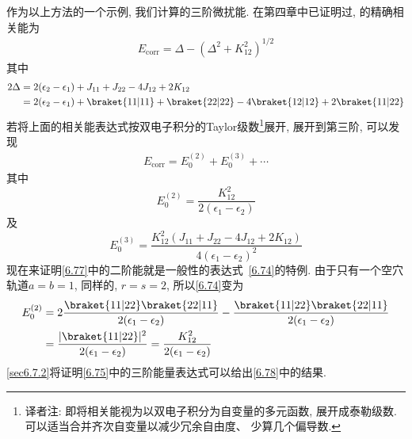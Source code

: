 作为以上方法的一个示例, 
我们计算的三阶微扰能. 
在第四章中已证明过, 
的精确相关能为
\begin{align}
E_\mathrm{corr} = \Delta - (\Delta^2 + K_{12}^2)^{1/2}
\label{6.76}
\end{align}
其中
\begin{align*}
2\Delta & = 2(\epsilon_2-\epsilon_1) + J_{11} + J_{22} - 4J_{12} + 2K_{12}\\
        & = 2(\epsilon_2-\epsilon_1) + \braket{11|11} + \braket{22|22} - 4\braket{12|12} + 2\braket{11|22}
\end{align*}
若将上面的相关能表达式按双电子积分的Taylor级数\footnote{
译者注: 即将相关能视为以双电子积分为自变量的多元函数,
展开成泰勒级数. 可以适当合并齐次自变量以减少冗余自由度、
少算几个偏导数.
}展开, 
展开到第三阶, 
可以发现
\begin{align*}
E_\mathrm{corr}  = E_0^{(2)} + E_0^{(3)} + \cdots
\end{align*}
其中
\begin{equation}
E_0^{(2)} = \frac{K_{12}^2}{2(\epsilon_1-\epsilon_2)}
\label{6.77}
\end{equation}
及
\begin{equation}
E_0^{(3)} = \frac{K_{12}^2(J_{11}+J_{22}-4J_{12}+2K_{12})}{4(\epsilon_1-\epsilon_2)^2}
\label{6.78}
\end{equation}
现在来证明\autoref{6.77}中的二阶能就是一般性的表达式~\eqref{6.74}的特例. 
由于只有一个空穴轨道$a=b=1$, 
 同样的, 
$r=s=2$, 
所以\autoref{6.74}变为
\begin{align*}
E_0^{(2)} & = 2\frac{\braket{11|22}\braket{22|11}}{2(\epsilon_1-\epsilon_2)} - \frac{\braket{11|22}\braket{22|11}}{2(\epsilon_1-\epsilon_2)} \\
          & = \frac{|\braket{11|22}|^2}{2(\epsilon_1-\epsilon_2)} = \frac{K_{12}^2}{2(\epsilon_1-\epsilon_2)}
\end{align*}
\autoref{sec6.7.2}将证明\autoref{6.75}中的三阶能量表达式可以给出\autoref{6.78}中的结果.

